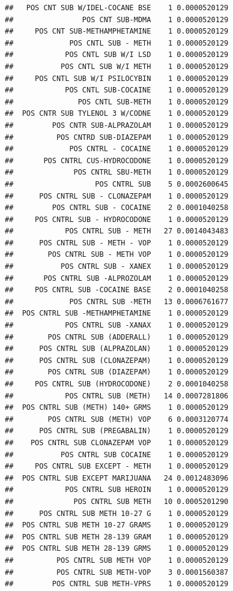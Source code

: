 \documentclass[]{book}
\begin{document}
\begin{verbatim}
##   POS CNT SUB W/IDEL-COCANE BSE    1 0.0000520129
##                POS CNT SUB-MDMA    1 0.0000520129
##     POS CNT SUB-METHAMPHETAMINE    1 0.0000520129
##             POS CNTL SUB - METH    1 0.0000520129
##            POS CNTL SUB W/I LSD    1 0.0000520129
##           POS CNTL SUB W/I METH    1 0.0000520129
##     POS CNTL SUB W/I PSILOCYBIN    1 0.0000520129
##            POS CNTL SUB-COCAINE    1 0.0000520129
##               POS CNTL SUB-METH    1 0.0000520129
##  POS CNTR SUB TYLENOL 3 W/CODNE    1 0.0000520129
##         POS CNTR SUB-ALPRAZOLAM    1 0.0000520129
##          POS CNTRD SUB-DIAZEPAM    1 0.0000520129
##             POS CNTRL - COCAINE    1 0.0000520129
##       POS CNTRL CUS-HYDROCODONE    1 0.0000520129
##              POS CNTRL SBU-METH    1 0.0000520129
##                   POS CNTRL SUB    5 0.0002600645
##      POS CNTRL SUB - CLONAZEPAM    1 0.0000520129
##         POS CNTRL SUB - COCAINE    2 0.0001040258
##     POS CNTRL SUB - HYDROCODONE    1 0.0000520129
##            POS CNTRL SUB - METH   27 0.0014043483
##      POS CNTRL SUB - METH - VOP    1 0.0000520129
##        POS CNTRL SUB - METH VOP    1 0.0000520129
##           POS CNTRL SUB - XANEX    1 0.0000520129
##       POS CNTRL SUB -ALPROZOLAM    1 0.0000520129
##     POS CNTRL SUB -COCAINE BASE    2 0.0001040258
##             POS CNTRL SUB -METH   13 0.0006761677
##  POS CNTRL SUB -METHAMPHETAMINE    1 0.0000520129
##            POS CNTRL SUB -XANAX    1 0.0000520129
##        POS CNTRL SUB (ADDERALL)    1 0.0000520129
##      POS CNTRL SUB (ALPRAZOLAN)    1 0.0000520129
##      POS CNTRL SUB (CLONAZEPAM)    1 0.0000520129
##        POS CNTRL SUB (DIAZEPAM)    1 0.0000520129
##     POS CNTRL SUB (HYDROCODONE)    2 0.0001040258
##            POS CNTRL SUB (METH)   14 0.0007281806
##  POS CNTRL SUB (METH) 140+ GRMS    1 0.0000520129
##        POS CNTRL SUB (METH) VOP    6 0.0003120774
##      POS CNTRL SUB (PREGABALIN)    1 0.0000520129
##    POS CNTRL SUB CLONAZEPAM VOP    1 0.0000520129
##           POS CNTRL SUB COCAINE    1 0.0000520129
##     POS CNTRL SUB EXCEPT - METH    1 0.0000520129
##  POS CNTRL SUB EXCEPT MARIJUANA   24 0.0012483096
##            POS CNTRL SUB HEROIN    1 0.0000520129
##              POS CNTRL SUB METH   10 0.0005201290
##      POS CNTRL SUB METH 10-27 G    1 0.0000520129
##  POS CNTRL SUB METH 10-27 GRAMS    1 0.0000520129
##  POS CNTRL SUB METH 28-139 GRAM    1 0.0000520129
##  POS CNTRL SUB METH 28-139 GRMS    1 0.0000520129
##          POS CNTRL SUB METH VOP    1 0.0000520129
##          POS CNTRL SUB METH-VOP    3 0.0001560387
##         POS CNTRL SUB METH-VPRS    1 0.0000520129

\end{verbatim}
\end{document}
